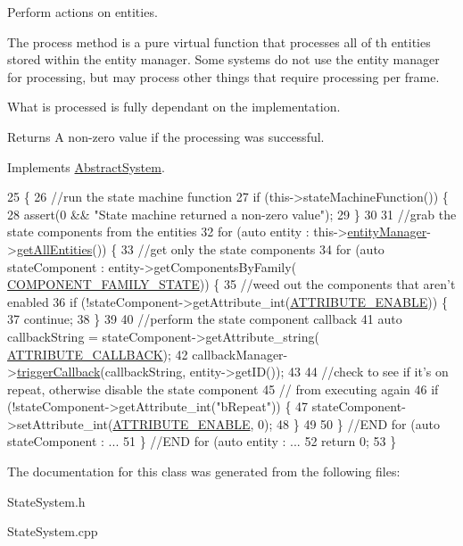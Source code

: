 Perform actions on entities. 

The process method is a pure virtual function that processes all of th entities stored within the entity manager. Some systems do not use the entity manager for processing, but may process other things that require processing per frame.

What is processed is fully dependant on the implementation.

\begin{DoxyReturn}{Returns}
A non-\/zero value if the processing was successful. 
\end{DoxyReturn}


Implements \hyperlink{class_abstract_system_af8bfe74feb5df2b5e3fff67bfe1106b9}{Abstract\-System}.


\begin{DoxyCode}
25                          \{
26     \textcolor{comment}{//run the state machine function}
27     \textcolor{keywordflow}{if} (this->stateMachineFunction()) \{
28         assert(0 && \textcolor{stringliteral}{"State machine returned a non-zero value"});
29     \}
30 
31     \textcolor{comment}{//grab the state components from the entities}
32     \textcolor{keywordflow}{for} (\textcolor{keyword}{auto} entity : this->\hyperlink{class_abstract_system_ac0d16e94f5cea4b1a6bf489d35d7a14d}{entityManager}->\hyperlink{class_entity_manager_a452113e422a9c501bb008761f7609e33}{getAllEntities}()) \{
33         \textcolor{comment}{//get only the state components}
34         \textcolor{keywordflow}{for} (\textcolor{keyword}{auto} stateComponent : entity->getComponentsByFamily(
      \hyperlink{_state_component_8h_aac90c254d3963717ccf0661a124a0d20}{COMPONENT\_FAMILY\_STATE})) \{
35             \textcolor{comment}{//weed out the components that aren't enabled}
36             \textcolor{keywordflow}{if} (!stateComponent->getAttribute\_int(\hyperlink{_a_e___attributes_8h_a4c775095baf8a9c99621ad9ad3b622db}{ATTRIBUTE\_ENABLE})) \{
37                 \textcolor{keywordflow}{continue};
38             \}
39 
40             \textcolor{comment}{//perform the state component callback}
41             \textcolor{keyword}{auto} callbackString = stateComponent->getAttribute\_string(
      \hyperlink{_a_e___attributes_8h_a8602d00b356bb7e6ba95069a94fd5555}{ATTRIBUTE\_CALLBACK});
42             callbackManager->\hyperlink{class_callback_manager_a4c5dc4430f0fb5cebe240be020a8fbe9}{triggerCallback}(callbackString, entity->getID());
43 
44             \textcolor{comment}{//check to see if it's on repeat, otherwise disable the state component}
45             \textcolor{comment}{// from executing again}
46             \textcolor{keywordflow}{if} (!stateComponent->getAttribute\_int(\textcolor{stringliteral}{"bRepeat"})) \{
47                 stateComponent->setAttribute\_int(\hyperlink{_a_e___attributes_8h_a4c775095baf8a9c99621ad9ad3b622db}{ATTRIBUTE\_ENABLE}, 0);
48             \}
49 
50         \} \textcolor{comment}{//END for (auto stateComponent : ...}
51     \} \textcolor{comment}{//END for (auto entity : ...}
52     \textcolor{keywordflow}{return} 0;
53 \}\end{DoxyCode}


The documentation for this class was generated from the following files\-:\begin{DoxyCompactItemize}
\item 
State\-System.\-h\item 
State\-System.\-cpp\end{DoxyCompactItemize}
